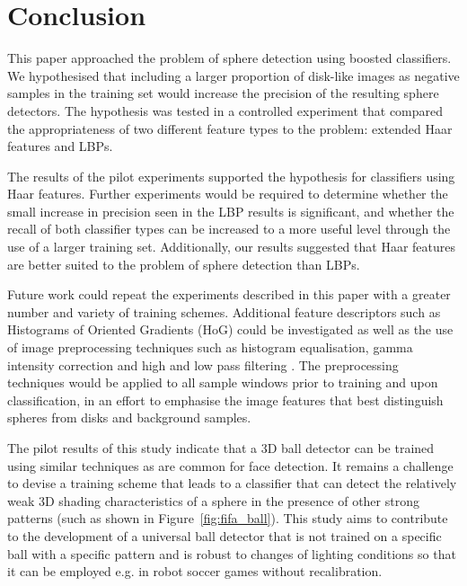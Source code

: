 \documentclass{sig-alternate-05-2015}
\newcommand{\tmpcomment}[1]{}
\newcommand{\citep}[1]{\cite{#1}}
\begin{document}
	\section{Conclusion} {
	\label{sec:conclusion}


		This paper approached the problem of sphere detection using boosted classifiers.
		We hypothesised that including a larger proportion of disk-like images as negative samples in the training set would increase the precision of the resulting sphere detectors.
		The hypothesis was tested in a controlled experiment that compared the appropriateness of two different feature types to the problem: extended Haar features\tmpcomment{, HoGs,} and LBPs.


    The results of the pilot experiments supported the hypothesis for classifiers using Haar features. Further experiments would be required to determine whether the small increase in precision seen in the LBP results is significant, and whether the recall of both classifier types can be increased to a more useful level through the use of a larger training set.
    Additionally, our results suggested that Haar features are better suited to the problem of sphere detection than LBPs.

		Future work could repeat the experiments described in this paper with a greater number and variety of training schemes.
    Additional feature descriptors such as Histograms of Oriented Gradients (HoG) could be investigated as well as the use of image preprocessing techniques such as histogram equalisation, gamma intensity correction and high and low pass filtering \citep{gross2003image}.
    The preprocessing techniques would be applied to all sample windows prior to training and upon classification, in an effort to emphasise the image features that best distinguish spheres from disks and background samples.

    The pilot results of this study indicate that a 3D ball detector can be trained using similar techniques as are common for face detection. It remains a challenge to devise a training scheme that leads to a classifier that can detect the relatively weak 3D shading characteristics of a sphere in the presence of other strong patterns (such as shown in Figure~\ref{fig:fifa_ball}). This study aims to contribute to the development of a universal ball detector that is not trained on a specific ball with a specific pattern and is robust to changes of lighting conditions so that it can be employed e.g. in robot soccer games without recalibration.
	}
\end{document}
